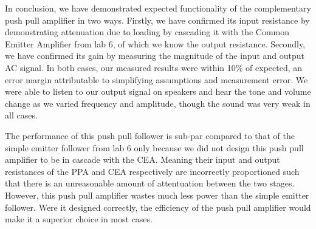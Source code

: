 \documentclass[12pt,letterpaper]{report}
\begin{document}
In conclusion, we have demonstrated expected functionality of the complementary push pull amplifier in two ways. Firstly, we have confirmed its input resistance by demonstrating attenuation due to loading by cascading it with the Common Emitter Amplifier from lab 6, of which we know the output resistance. Secondly, we have confirmed its gain by measuring the magnitude of the input and output AC signal. In both cases, our measured results were within 10\% of expected, an error margin attributable to simplifying assumptions and measurement error. We were able to listen to our output signal on speakers and hear the tone and volume change as we varied frequency and amplitude, though the sound was very weak in all cases.

The performance of this push pull follower is sub-par compared to that of the simple emitter follower from lab 6 only because we did not design this push pull amplifier to be in cascade with the CEA. Meaning their input and output resistances of the PPA and CEA respectively are incorrectly proportioned such that there is an unreasonable amount of attentuation between the two stages. However, this push pull amplifier wastes much less power than the simple emitter follower. Were it designed correctly, the efficiency of the push pull amplifier would make it a superior choice in most cases.
\end{document}
